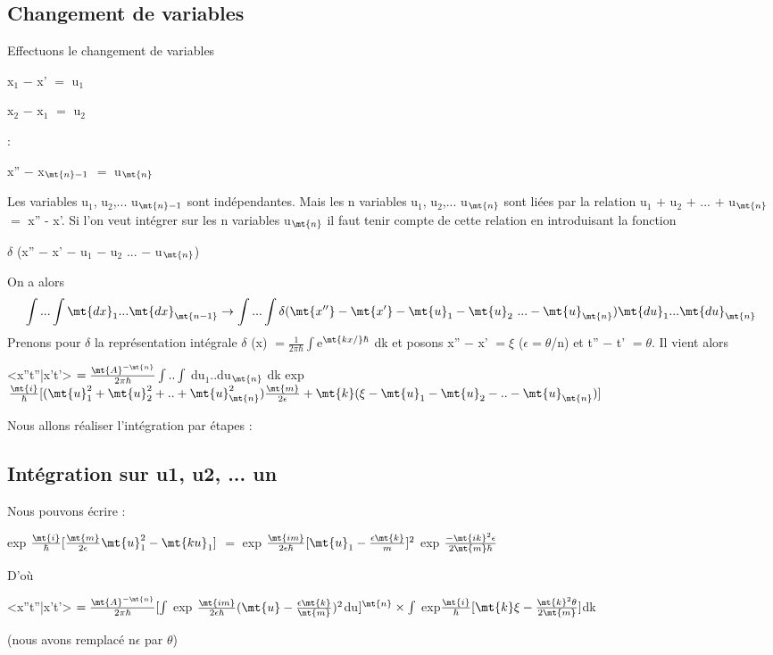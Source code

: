 \subsection{Changement de variables}

Effectuons le changement de variables

\hspace{2cm} x$_1$ $-$ x' $=$ u$_1$

\hspace{2cm} x$_2$ $-$ x$_1$ $=$ u$_2$

\hspace{2.6cm} :

\hspace{2cm} x'' $-$ x$_{\mt{n}-1}$ $=$ u$_\mt{n}$


Les variables u$_1$, u$_2$,... u$_{\mt{n}-1}$ sont indépendantes. Mais les
n variables u$_1$, u$_2$,... u$_\mt{n}$ sont liées par la relation
u$_1$ $+$ u$_2$ $+$ ... $+$ u$_\mt{n}$ $=$ x'' - x'. Si l'on veut intégrer sur les n variables u$_\mt{n}$ il faut tenir compte
de cette relation en introduisant la fonction
\begin{center}
$\delta$ (x'' $-$ x' $-$ u$_1$ $-$ u$_2$ ... $-$ u$_\mt{n}$)
\end{center}
On a alors
\[
\int...\int \mt{dx}_1...\mt{dx}_\mt{n-1} \to \int...\int
 \delta (\mt{x''} - \mt{x'} - \mt{u}_1 - \mt{u}_2 \ ... - \mt{u}_\mt{n})
\mt{du}_1...\mt{du}_\mt{n}
\]
Prenons pour $\delta$ la représentation intégrale
$\delta$ (x) $=\frac{1}{2\pi\hbar}\int$e$^{\mt{kx/}\hbar}$   dk
et posons x'' $-$ x' $=\xi$ ($\epsilon=\theta$/n) et
t'' $-$ t' $=\theta$.
Il vient alors
\begin{center}
<x''t''|x't'> $=\frac{\mt{A}^{-\mt{n}}}{2\pi\hbar} \int..\int$ du$_1$..du$_\mt{n}$
dk exp $\frac{\mt{i}}{\hbar}[(\mt{u}_1^2+\mt{u}_2^2+..+\mt{u}_\mt{n}^2)\frac{\mt{m}}{2\epsilon}
+\mt{k}(\xi-\mt{u}_1-\mt{u}_2-..-\mt{u}_\mt{n})]$
\end{center}
Nous allons réaliser l'intégration par étapes :
\subsection{Intégration sur u1, u2, ... un}
Nous pouvons écrire :
\begin{center}
exp $\frac{\mt{i}}{\hbar}[\frac{\mt{m}}{2\epsilon}\mt{u}_1^2-\mt{ku}_1]$ $=$
exp $\frac{\mt{im}}{2\epsilon\hbar}[\mt{u}_1-\frac{\epsilon\mt{k}}{m}]^2$
exp $\frac{-\mt{ik}^2\epsilon}{2\mt{m}\hbar}$
\end{center}
D'où
\begin{center}
<x''t''|x't'> $=\frac{\mt{A}^{-\mt{n}}}{2\pi\hbar} [ \int$
exp $\frac{\mt{im}}{2\epsilon\hbar}(\mt{u}-\frac{\epsilon\mt{k}}{\mt{m}})^2 $du$]^\mt{n}
\times \int$  exp$\frac{\mt{i}}{\hbar}[\mt{k}\xi-\frac{\mt{k}^2\theta}{2\mt{m}}]$dk 
\end{center}
(nous avons remplacé n$\epsilon$ par $\theta$)


